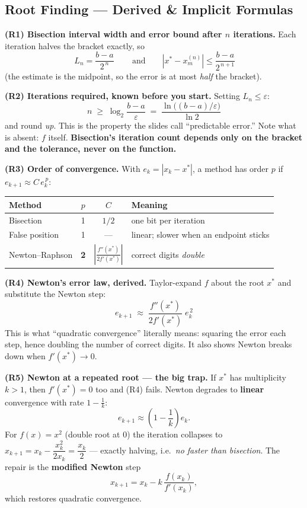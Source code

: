 \subsection{Root Finding --- Derived \& Implicit Formulas}

\begin{derivedbox}
\textbf{(R1) Bisection interval width and error bound after $n$ iterations.}
Each iteration halves the bracket exactly, so
\[
\boxed{\,L_n = \frac{b-a}{2^{\,n}}\,}\qquad\text{and}\qquad |x^\ast - x_m^{(n)}| \le \frac{b-a}{2^{\,n+1}}
\]
(the estimate is the midpoint, so the error is at most \emph{half} the bracket).

\smallskip
\textbf{(R2) Iterations required, known before you start.} Setting $L_n \le \varepsilon$:
\[
\boxed{\;n \;\ge\; \log_2\!\frac{b-a}{\varepsilon} \;=\; \frac{\ln\big((b-a)/\varepsilon\big)}{\ln 2}\;}
\]
and round \emph{up}. This is the property the slides call ``predictable error.'' Note what is absent: $f$ itself. \textbf{Bisection's iteration count depends only on the bracket and the tolerance, never on the function.}

\smallskip
\textbf{(R3) Order of convergence.} With $e_k = |x_k - x^\ast|$, a method has order $p$ if $e_{k+1}\approx C\,e_k^{\,p}$:
\begin{center}\small
\begin{tabular}{@{}lccl@{}}
\toprule
Method & $p$ & $C$ & Meaning\\
\midrule
Bisection & 1 & $1/2$ & one bit per iteration\\
False position & 1 & --- & linear; slower when an endpoint sticks\\
Newton--Raphson & \textbf{2} & $\left|\frac{f''(x^\ast)}{2f'(x^\ast)}\right|$ & correct digits \emph{double}\\
\bottomrule
\end{tabular}
\end{center}

\smallskip
\textbf{(R4) Newton's error law, derived.} Taylor-expand $f$ about the root $x^\ast$ and substitute the Newton step:
\[
\boxed{\;e_{k+1} \;\approx\; \frac{f''(x^\ast)}{2f'(x^\ast)}\;e_k^{\,2}\;}
\]
This is what ``quadratic convergence'' literally means: squaring the error each step, hence doubling the number of correct digits. It also shows Newton breaks down when $f'(x^\ast)\to 0$.

\smallskip
\textbf{(R5) Newton at a repeated root --- the big trap.} If $x^\ast$ has multiplicity $k>1$, then $f'(x^\ast)=0$ too and (R4) fails. Newton degrades to \textbf{linear} convergence with rate $1-\tfrac1k$:
\[
e_{k+1} \approx \left(1-\frac1k\right)e_k .
\]
For $f(x)=x^2$ (double root at 0) the iteration collapses to $x_{k+1} = x_k - \dfrac{x_k^2}{2x_k} = \dfrac{x_k}{2}$ --- exactly halving, i.e.\ \emph{no faster than bisection}. The repair is the \textbf{modified Newton} step
\[
x_{k+1} = x_k - k\,\frac{f(x_k)}{f'(x_k)},
\]
which restores quadratic convergence.


\end{derivedbox}
